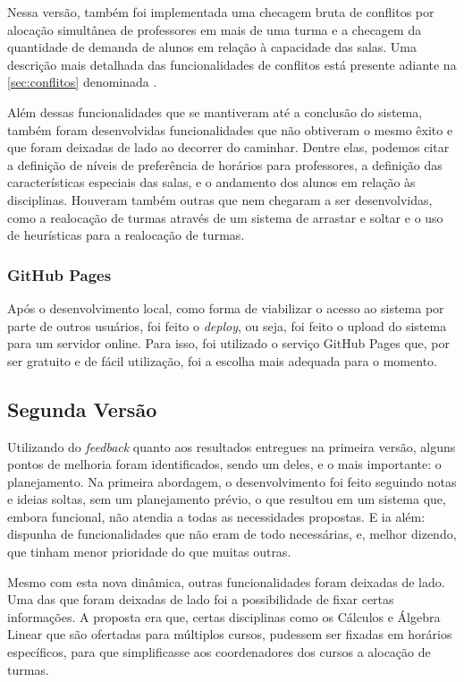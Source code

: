 Nessa versão, também foi implementada uma checagem bruta de conflitos por alocação simultânea de professores em mais de uma turma e a checagem da quantidade de demanda de alunos em relação à capacidade das salas. Uma descrição mais detalhada das funcionalidades de conflitos está presente adiante na \autoref{sec:conflitos} denominada .

Além dessas funcionalidades que se mantiveram até a conclusão do sistema, também foram desenvolvidas funcionalidades que não obtiveram o mesmo êxito e que foram deixadas de lado ao decorrer do caminhar. Dentre elas, podemos citar a definição de níveis de preferência de horários para professores, a definição das características especiais das salas, e o andamento dos alunos em relação às disciplinas. Houveram também outras que nem chegaram a ser desenvolvidas, como a realocação de turmas através de um sistema de arrastar e soltar e o uso de heurísticas para a realocação de turmas.

\subsubsection{GitHub Pages}

Após o desenvolvimento local, como forma de viabilizar o acesso ao sistema por parte de outros usuários, foi feito o \textit{deploy}, ou seja, foi feito o upload do sistema para um servidor online. Para isso, foi utilizado o serviço GitHub Pages que, por ser gratuito e de fácil utilização, foi a escolha mais adequada para o momento.

\subsection{Segunda Versão} %

Utilizando do \textit{feedback} quanto aos resultados entregues na primeira versão, alguns pontos de melhoria foram identificados, sendo um deles, e o mais importante: o planejamento. Na primeira abordagem, o desenvolvimento foi feito seguindo notas e ideias soltas, sem um planejamento prévio, o que resultou em um sistema que, embora funcional, não atendia a todas as necessidades propostas. E ia além: dispunha de funcionalidades que não eram de todo necessárias, e, melhor dizendo, que tinham menor prioridade do que muitas outras.

Mesmo com esta nova dinâmica, outras funcionalidades foram deixadas de lado. Uma das que foram deixadas de lado foi a possibilidade de fixar certas informações. A proposta era que, certas disciplinas como os Cálculos e Álgebra Linear que são ofertadas para múltiplos cursos, pudessem ser fixadas em horários específicos, para que simplificasse aos coordenadores dos cursos a alocação de turmas.

